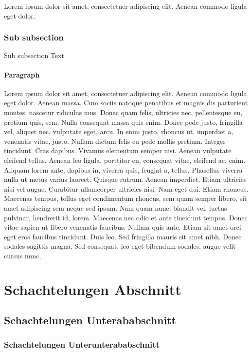 \documentclass[english,ngerman]{book}%
\theoremstyle{dgdef}
\theoremstyle{dgthm}
\begin{document}
Lorem ipsum dolor sit amet, consectetuer adipiscing elit. Aenean commodo ligula eget dolor.

\subsubsection{Sub subsection}

Sub subsection Text

\paragraph{Paragraph}

Lorem ipsum dolor sit amet, consectetuer adipiscing elit. Aenean commodo ligula eget dolor. Aenean massa. Cum sociis natoque penatibus et magnis dis parturient montes, nascetur ridiculus mus. Donec quam felis, ultricies nec, pellentesque eu, pretium quis, sem. Nulla consequat massa quis enim. Donec pede justo, fringilla vel, aliquet nec, vulputate eget, arcu. In enim justo, rhoncus ut, imperdiet a, venenatis vitae, justo. Nullam dictum felis eu pede mollis pretium. Integer tincidunt. Cras dapibus. Vivamus elementum semper nisi. Aenean vulputate eleifend tellus. Aenean leo ligula, porttitor eu, consequat vitae, eleifend ac, enim. Aliquam lorem ante, dapibus in, viverra quis, feugiat a, tellus. Phasellus viverra nulla ut metus varius laoreet. Quisque rutrum. Aenean imperdiet. Etiam ultricies nisi vel augue. Curabitur ullamcorper ultricies nisi. Nam eget dui. Etiam rhoncus. Maecenas tempus, tellus eget condimentum rhoncus, sem quam semper libero, sit amet adipiscing sem neque sed ipsum. Nam quam nunc, blandit vel, luctus pulvinar, hendrerit id, lorem. Maecenas nec odio et ante tincidunt tempus. Donec vitae sapien ut libero venenatis faucibus. Nullam quis ante. Etiam sit amet orci eget eros faucibus tincidunt. Duis leo. Sed fringilla mauris sit amet nibh. Donec sodales sagittis magna. Sed consequat, leo eget bibendum sodales, augue velit cursus nunc,

\section{Schachtelungen Abschnitt}

\subsection{Schachtelungen Unterababschnitt}

\subsubsection{Schachtelungen Unterunterababschnitt}
\end{document}
